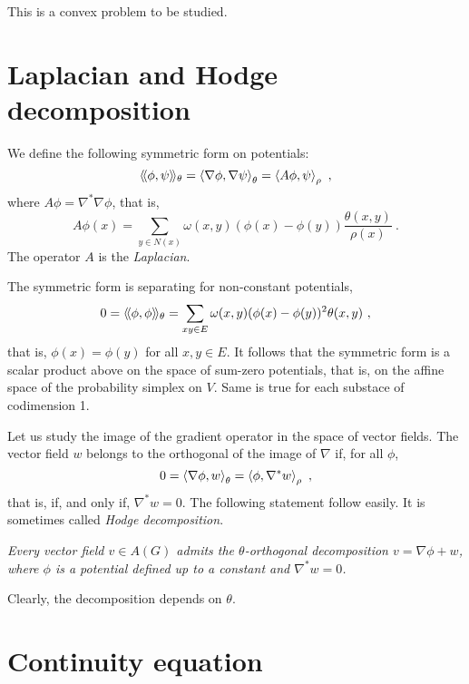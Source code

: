 \documentclass[12pt,a4paper]{amsart}
\begin{document}
This is a convex problem to be studied. 

\section{Laplacian and Hodge decomposition}
\label{sec:laplacian}

We define the following symmetric form on potentials:
\begin{equation*}
  \left\langle\!\langle\phi,\psi\right\rangle\!\rangle_{\theta} = \left\langle\nabla\phi,\nabla\psi\right\rangle_{\theta} = \left\langle A \phi,\psi\right\rangle_{\rho} \ , 
\end{equation*}
where $A \phi = \nabla^* \nabla\phi$, that is,
\begin{equation*}
  A\phi(x) = \sum_{y \in N(x)} \omega(x,y) (\phi(x) - \phi(y))
  \frac{\theta(x,y)}{\rho(x)} \ .
\end{equation*}
The operator $A$ is the
\emph{Laplacian}.

The symmetric form is separating for non-constant potentials,
\begin{equation*}
  0 = \left\langle\!\langle\phi,\phi\right\rangle\!\rangle_{\theta} = \sum_{xy \in E} \omega(x,y)
  (\phi(x) - \phi(y))^2 \theta(x,y) \ , 
\end{equation*}
that is, $\phi(x) = \phi(y)$ for all $x,y \in E$. It follows that the
symmetric form is a scalar product above on the space of sum-zero
potentials, that is, on the affine space of the probability simplex on
$V$. Same is true for each substace of codimension 1.

Let us study the image of the gradient operator in the space of vector
fields. The vector field $w$ belongs to the  orthogonal of the image of
$\nabla$ if, for all $\phi$,
\begin{equation*}
  0 = \left\langle\nabla \phi,w\right\rangle_{\theta} = \left\langle\phi,\nabla^* w\right\rangle_{\rho} \ ,
\end{equation*}
that is, if, and only if, $\nabla^* w  = 0$. The following
statement follow easily. It is sometimes called \emph{Hodge decomposition}.

\emph{Every vector field $v \in A(G)$ admits the $\theta$-orthogonal
  decomposition $v = \nabla \phi + w$, where $\phi$ is a potential
  defined up to a constant and $\nabla^* w = 0$.}

Clearly, the decomposition depends on $\theta$.

\section{Continuity equation}
\label{sec:continuity}
\end{document}
